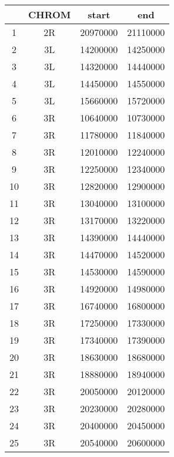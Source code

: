 \centering \begin{tabular}{c|c|c|c}
 	&CHROM	&start	&end\\\hline
1	&2R	&20970000	&21110000\\
2	&3L	&14200000	&14250000\\
3	&3L	&14320000	&14440000\\
4	&3L	&14450000	&14550000\\
5	&3L	&15660000	&15720000\\
6	&3R	&10640000	&10730000\\
7	&3R	&11780000	&11840000\\
8	&3R	&12010000	&12240000\\
9	&3R	&12250000	&12340000\\
10	&3R	&12820000	&12900000\\
11	&3R	&13040000	&13100000\\
12	&3R	&13170000	&13220000\\
13	&3R	&14390000	&14440000\\
14	&3R	&14470000	&14520000\\
15	&3R	&14530000	&14590000\\
16	&3R	&14920000	&14980000\\
17	&3R	&16740000	&16800000\\
18	&3R	&17250000	&17330000\\
19	&3R	&17340000	&17390000\\
20	&3R	&18630000	&18680000\\
21	&3R	&18880000	&18940000\\
22	&3R	&20050000	&20120000\\
23	&3R	&20230000	&20280000\\
24	&3R	&20400000	&20450000\\
25	&3R	&20540000	&20600000\\
\end{tabular}
